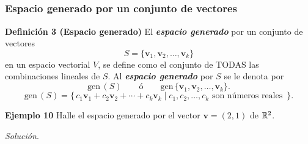 
\subsection{}

{\nologo
\begin{frame}\frametitle{Espacio generado por un conjunto de vectores}

\begin{block}{\textbf{Definición 3 (Espacio generado)}}
	\justifying
	El \textbf{\textit{espacio generado}} por un conjunto de vectores 
	\[
	S=\{\mathbf{v}_1,\mathbf{v}_2,\hdots,\mathbf{v}_k\}
	\]
	en un espacio vectorial $V$, se define como el conjunto de TODAS las combinaciones lineales de $S$.
	Al \textbf{\textit{espacio generado}} por $S$ se le denota por 
	\[
	\text{gen}\,(S) \qquad \text{ó} \qquad \text{gen}\, \{\mathbf{v}_1,\mathbf{v}_2,\hdots,\mathbf{v}_k\}.
	\]
	\[
	\text{gen}\,(S) = \Big\{ \, c_1\mathbf{v}_1 + c_2\mathbf{v}_2 + \cdots + c_k\mathbf{v}_k \mid c_1, c_2,\hdots,c_k  
	\text{ son números reales } \, \Big\}.
	\]
\end{block}

\begin{ej}{\textbf{Ejemplo 10}} \justifying
	Halle el espacio generado por el vector $\mathbf{v}=(2,1)$ de $\mathbb{R}^2$.
\end{ej}	

\textit{Solución}.

\end{frame}
}


\subsection{}


